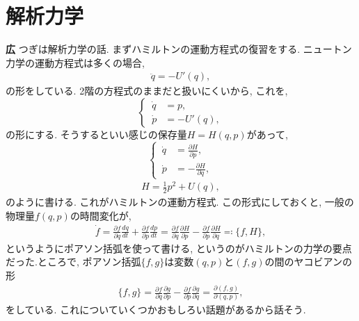\documentclass{ltjsarticle}
\theoremstyle{definition}
\begin{document}
\section{解析力学\label{section:analytic_mechanics}}
\noindent
\textbf{広} つぎは解析力学の話. まずハミルトンの運動方程式の復習をする. ニュートン力学の運動方程式は多くの場合,
\begin{align}
  \ddot q=-U'(q),
\end{align}
の形をしている. 2階の方程式のままだと扱いにくいから, これを,
\begin{equation}
  \left\{\,
  \begin{aligned}
    \dot q&=p,\\
    \dot p&=-U'(q),
  \end{aligned}
  \right.
\end{equation}
の形にする. そうするといい感じの保存量$H=H(q,p)$があって,
\begin{equation}
  \left\{\,
  \begin{aligned}
    \dot q&=\frac{\partial H}{\partial p},\\
    \dot p&=-\frac{\partial H}{\partial q},
  \end{aligned}
  \right.\label{eq:Hamilton_EOM}
\end{equation}
\begin{align}
  H=\frac12p^2+U(q),
\end{align}
のように書ける. これがハミルトンの運動方程式. この形式にしておくと, 一般の物理量$f(q,p)$の時間変化が,
\begin{align}
  \dot f=\frac{\partial f}{\partial q}\frac{dq}{dt}+\frac{\partial f}{\partial p}\frac{dp}{dt}=\frac{\partial f}{\partial q}\frac{\partial H}{\partial p}-\frac{\partial f}{\partial p}\frac{\partial H}{\partial q}\eqqcolon\{f,H\},
\end{align}
というようにポアソン括弧を使って書ける, というのがハミルトンの力学の要点だった.ところで, ポアソン括弧$\{f,g\}$は変数$(q,p)$と$(f,g)$の間のヤコビアンの形
\begin{align}
  \{f,g\}=\frac{\partial f}{\partial q}\frac{\partial g}{\partial p}-\frac{\partial f}{\partial p}\frac{\partial g}{\partial q}=\frac{\partial(f,g)}{\partial(q,p)},
\end{align}
をしている. これについていくつかおもしろい話題があるから話そう.
\end{document}
